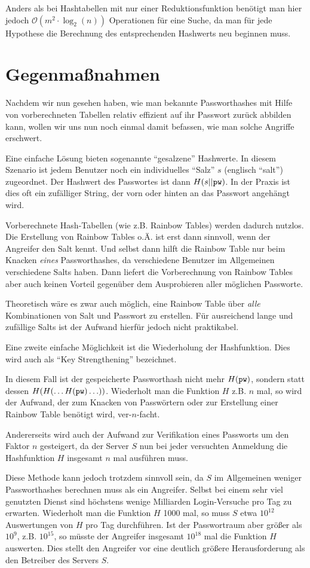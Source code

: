 Anders als bei Hashtabellen mit nur einer Reduktionsfunktion benötigt
man hier jedoch $\mathcal{O}(m^2 \cdot \log_2(n))$ Operationen für eine
Suche, da man für jede Hypothese die Berechnung des entsprechenden
Hashwerts neu beginnen muss.

\section{Gegenmaßnahmen}


Nachdem wir nun gesehen haben, wie man bekannte Passworthashes mit Hilfe
von vorberechneten Tabellen relativ effizient auf ihr Passwort zurück
abbilden kann, wollen wir uns nun noch einmal damit befassen, wie man
solche Angriffe erschwert.

Eine einfache Lösung bieten sogenannte "`gesalzene"' Hashwerte. In
diesem Szenario ist jedem Benutzer noch ein individuelles "`Salz"' $s$
(englisch "`salt"') zugeordnet. Der Hashwert des Passwortes ist dann
$H(s || \texttt{pw})$. In der Praxis ist dies oft ein zufälliger String, der vorn
oder hinten an das Passwort angehängt wird.

Vorberechnete Hash-Tabellen (wie z.B. Rainbow Tables)
werden dadurch nutzlos. Die Erstellung von Rainbow Tables o.Ä. ist erst
dann sinnvoll, wenn der Angreifer den Salt kennt. Und selbst dann hilft
die Rainbow Table nur beim Knacken \emph{eines} Passworthashes, da
verschiedene Benutzer im Allgemeinen verschiedene Salts haben. Dann
liefert die Vorberechnung von Rainbow Tables aber auch keinen Vorteil
gegenüber dem Ausprobieren aller möglichen Passworte.


Theoretisch wäre es zwar auch möglich, eine Rainbow Table über
\emph{alle} Kombinationen von Salt und Passwort zu erstellen. Für
ausreichend lange und zufällige Salts ist der Aufwand hierfür jedoch
nicht praktikabel.

Eine zweite einfache Möglichkeit ist die Wiederholung der
Hashfunktion. Dies wird auch als "`Key Strengthening"' bezeichnet.

In diesem Fall ist der gespeicherte Passworthash nicht mehr $H(\texttt{pw})$,
sondern statt dessen $H(H(\ldots H(\texttt{pw})\ldots))$. Wiederholt man die Funktion $H$
z.B. $n$ mal, so wird der Aufwand, der zum Knacken von Passwörtern oder
zur Erstellung einer Rainbow Table benötigt wird, ver-$n$-facht.

Andererseits wird auch der Aufwand zur Verifikation eines Passworts um
den Faktor $n$ gesteigert, da der Server $S$ nun bei jeder versuchten
Anmeldung die Hashfunktion $H$ insgesamt $n$ mal ausführen muss.

Diese Methode kann jedoch trotzdem sinnvoll sein, da $S$ im Allgemeinen
weniger Passworthashes berechnen muss als ein Angreifer. Selbst bei
einem sehr viel genutzten Dienst sind höchstens wenige Milliarden
Login-Versuche pro Tag zu erwarten. Wiederholt man die Funktion $H$ 1000
mal, so muss $S$ etwa $10^{12}$ Auswertungen von $H$ pro Tag
durchführen. Ist der Passwortraum aber größer als $10^9$,
z.B. $10^{15}$, so müsste der Angreifer insgesamt $10^{18}$ mal die
Funktion $H$ auswerten. Dies stellt den Angreifer vor eine deutlich
größere Herausforderung als den Betreiber des Servers $S$.
